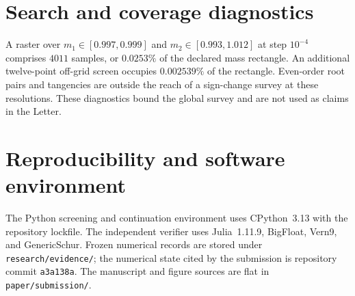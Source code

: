 \documentclass[aps,prl,onecolumn,amsmath,amssymb]{revtex4-2}
\begin{document}
\section{Search and coverage diagnostics}

A raster over $m_1\in[0.997,0.999]$ and $m_2\in[0.993,1.012]$ at step
$10^{-4}$ comprises $4011$ samples, or $0.0253\%$ of the declared mass
rectangle. An additional twelve-point off-grid screen occupies $0.002539\%$ of
the rectangle. Even-order root pairs and tangencies are outside the reach of a
sign-change survey at these resolutions. These diagnostics bound the global
survey and are not used as claims in the Letter.

\section{Reproducibility and software environment}

The Python screening and continuation environment uses CPython~3.13 with the
repository lockfile. The independent verifier uses Julia~1.11.9, BigFloat,
Vern9, and GenericSchur. Frozen numerical records are stored under
\texttt{research/evidence/}; the numerical state cited by the submission is
repository commit \texttt{a3a138a}. The manuscript and figure sources are flat
in \texttt{paper/submission/}.


\end{document}
